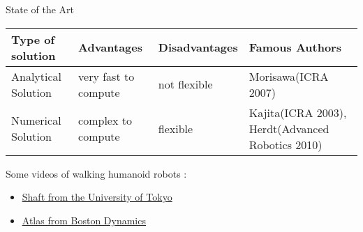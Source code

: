 \begin{frame}{State of the Art}

\begin{table}
\footnotesize
\begin{tabularx}{340pt}{ | X | X | X | X | }
\hline
Type of solution & Advantages & Disadvantages & Famous Authors \\
\hline \hline
Analytical Solution & very fast to compute & not flexible & Morisawa(ICRA 2007) \\
\hline
Numerical Solution & complex to compute & flexible & Kajita(ICRA 2003), Herdt(Advanced Robotics 2010) \\
\hline
\end{tabularx}
\end{table}

Some videos of walking humanoid robots :\\
\begin{itemize}
  \item \href{https://www.youtube.com/watch?v=diaZFIUBMBQ}
    {\color{black!20!red} Shaft from the University of Tokyo}
  \item \href{https://www.youtube.com/watch?v=SD6Okylclb8}
    {\color{black!20!red} Atlas from Boston Dynamics}
\end{itemize}


\end{frame}
